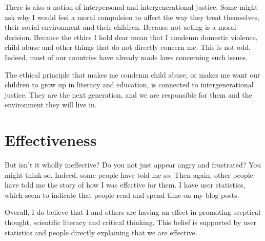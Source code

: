 \begin{multicols}{2}
There is also a notion of interpersonal and intergenerational justice. Some might ask why I would feel a moral compulsion to affect the way
they treat themselves, their social environment and their children. Because not acting is a moral decision. Because the ethics I hold dear 
mean that I condemn domestic violence, child abuse and other things that do not directly concern me. This is not odd. Indeed, most of our
countries have already made laws concerning such issues. 


The ethical principle that makes me condemn child abuse, or makes me want our children to grow up in literacy and education, is connected to
intergenerational justice. They are the next generation, and we are responsible for them and the environment they will live in. 

\section{Effectiveness}

But isn't it wholly ineffective? Do you not just appear angry and frustrated? You might think so. Indeed, some people have told me so. Then again,
other people have told me the story of how I was effective for them. I have user statistics, which seem to indicate that people read and spend time
on my blog posts. 


Overall, I do believe that I and others are having an effect in promoting sceptical thought, scientific literacy and critical thinking. This belief
is supported by user statistics and people directly explaining that we are effective. 

\end{multicols}